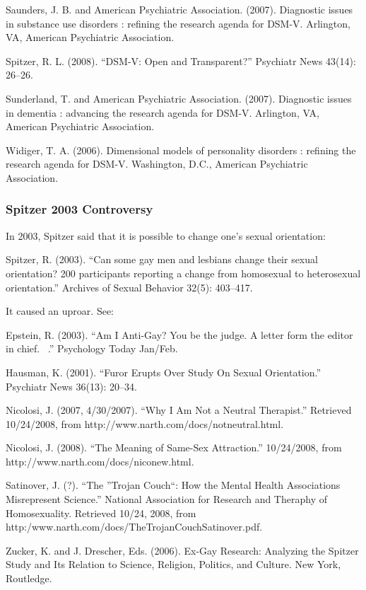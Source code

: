 \begin{refsection}
Saunders, J. B. and American Psychiatric Association. (2007). Diagnostic issues in substance use disorders : refining the research agenda for DSM-V. Arlington, VA, American Psychiatric Association.

Spitzer, R. L. (2008). ``DSM-V: Open and Transparent?'' Psychiatr News 43(14): 26--26.

Sunderland, T. and American Psychiatric Association. (2007). Diagnostic issues in dementia : advancing the research agenda for DSM-V. Arlington, VA, American Psychiatric Association.

Widiger, T. A. (2006). Dimensional models of personality disorders : refining the research agenda for DSM-V. Washington, D.C., American Psychiatric Association.

\subsubsection{Spitzer 2003 Controversy}
\label{spitzer2003controversy}

In 2003, Spitzer said that it is possible to change one’s sexual orientation:

Spitzer, R. (2003). ``Can some gay men and lesbians change their sexual orientation? 200 participants reporting a change from homosexual to heterosexual orientation.'' Archives of Sexual Behavior 32(5): 403--417.

It caused an uproar. See:

Epstein, R. (2003). ``Am I Anti-Gay? You be the judge. A letter form the editor in chief.  .'' Psychology Today Jan\slash Feb.

Hausman, K. (2001). ``Furor Erupts Over Study On Sexual Orientation.'' Psychiatr News 36(13): 20--34.

Nicolosi, J. (2007, 4\slash 30\slash 2007). ``Why I Am Not a Neutral Therapist.'' Retrieved 10\slash 24\slash 2008, from http:\slash \slash www.narth.com\slash docs\slash notneutral.html.

Nicolosi, J. (2008). ``The Meaning of Same-Sex Attraction.'' 10\slash 24\slash 2008, from http:\slash \slash www.narth.com\slash docs\slash niconew.html.

Satinover, J. (?). ``The ''Trojan Couch``: How the Mental Health Associations Misrepresent Science.'' National Association for Research and Theraphy of Homosexuality. Retrieved 10\slash 24, 2008, from http:\slash www.narth.com\slash docs\slash TheTrojanCouchSatinover.pdf.

Zucker, K. and J. Drescher, Eds. (2006). Ex-Gay Research: Analyzing the Spitzer Study and Its Relation to Science, Religion, Politics, and Culture. New York, Routledge.


\end{refsection}
